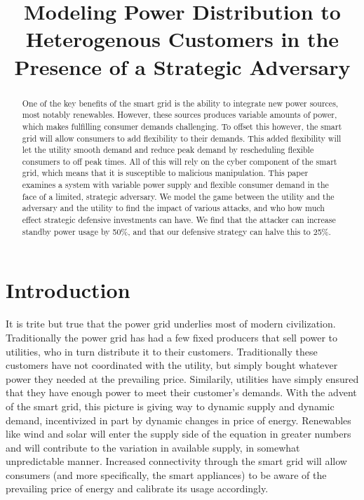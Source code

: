 \documentclass[conference]{IEEEtran}
\begin{document}
\title{Modeling Power Distribution to Heterogenous Customers in the Presence of a Strategic Adversary}

\author{
}

\maketitle

\begin{abstract}
One of the key benefits of the smart grid is the ability to integrate new power sources, most notably renewables.  However, these sources produces variable amounts of power, which makes fulfilling consumer demands challenging.  To offset this however, the smart grid will allow consumers to add flexibility to their demands.  This added flexibility will let the utility smooth demand and reduce peak demand by rescheduling flexible consumers to off peak times.  All of this will rely on the cyber component of the smart grid, which means that it is susceptible to malicious manipulation.  This paper examines a system with variable power supply and flexible consumer demand in the face of a limited, strategic adversary.  We model the game between the utility and the adversary and the utility to find the impact of various attacks, and who how much effect strategic defensive investments can have.  We find that the attacker can increase standby power usage by 50\%, and that our defensive strategy can halve this to 25\%.

\end{abstract}

\section{Introduction}
\label{Introduction}

It is trite but true that the power grid underlies most of modern civilization.  Traditionally the power grid has had a 
few fixed producers that sell power to utilities, who in turn distribute it to their customers.  Traditionally these 
customers have not coordinated with the utility, but simply bought whatever power they needed at the prevailing price.  
Similarily, utilities have simply ensured that they have enough power to meet their customer's demands.  
With the advent of the smart grid, this picture is giving way to dynamic supply and dynamic demand, incentivized in part by dynamic changes in price of energy.  Renewables like wind and solar will enter the supply side of the equation in greater numbers and will contribute to the variation in available supply, in somewhat unpredictable manner. Increased connectivity through the smart grid will allow consumers (and more specifically, the smart appliances) to be 
aware of the prevailing price of energy and calibrate its usage accordingly. 
\end{document}
